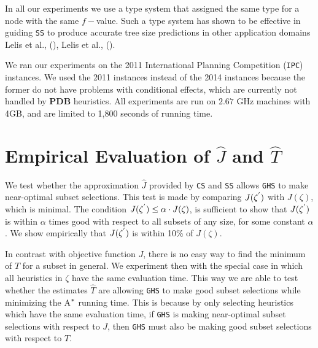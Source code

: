 In all our experiments we use a type system that assigned the same type for a node with the same $f-$value. Such a type system has shown to be effective in guiding \texttt{SS} to produce accurate tree size predictions in other application domains Lelis et al., (\citeyear{lelis2013predicting}), Lelis et al., (\citeyear{lelis2014memory}).

We ran our experiments on the 2011 International Planning Competition (\texttt{IPC}) instances. We used the 2011 instances instead of the 2014 instances because the former do not have problems with conditional effects, which are currently not handled by \textbf{PDB} heuristics. All experiments are run on $2.67$ GHz machines with 4GB, and are limited to 1,800 seconds of running time.\\

\section{Empirical Evaluation of $\hat{J}$ and $\hat{T}$}
\noindent
We test whether the approximation $\hat{J}$ provided by \texttt{CS} and \texttt{SS} allows \texttt{GHS} to make near-optimal subset selections. This test is made by comparing $J(\zeta\sp{'})$ with $J(\zeta)$, which is minimal. The condition $J(\zeta\sp{'}) \leq \alpha \cdot J(\zeta)$, is sufficient to show that $J(\zeta\sp{'})$ is within $\alpha$ times good with respect to all subsets of any size, for some constant $\alpha$. We show empirically that $J(\zeta\sp{'})$ is within 10\% of $J(\zeta)$. 

In contrast with objective function $J$, there is no easy way to find the minimum of $T$ for a subset in general. We experiment then with the special case in which all heuristics in $\zeta$ have the same evaluation time. This way we are able to test whether the estimates $\hat{T}$ are allowing \texttt{GHS} to make good subset selections while minimizing the A$\sp{*}$ running time. This is because by only selecting heuristics which have the same evaluation time, if \texttt{GHS} is making near-optimal subset selections with respect to $J$, then \texttt{GHS} must also be making good subset selections with respect to $T$.

